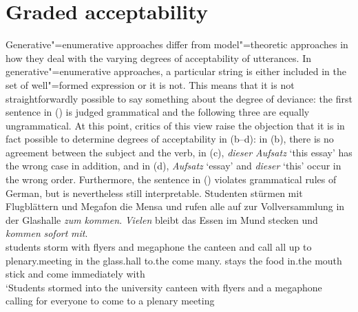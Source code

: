 \section{Graded acceptability}

Generative"=enumerative approaches differ from model"=theoretic approaches in how they deal with the varying degrees of acceptability
of utterances. In generative"=enumerative approaches, a particular string is either included in the set of well"=formed expression or it is not.
This means that it is not straightforwardly possible to say something about the degree of deviance: the first sentence in () is judged grammatical
and the following three are equally ungrammatical.
\eal
{}
\zl
At this point, critics of this view raise the objection that it is in fact possible to determine degrees of acceptability
in (b--d): in (b), there is no agreement between the subject and the verb, in
(c),  \emph{dieser Aufsatz} `this essay'  has the wrong case in addition, and in (d),
\emph{Aufsatz} `essay' and \emph{dieser} `this' occur in the wrong order. Furthermore,
 the sentence in () violates grammatical rules of German, but is nevertheless still interpretable.
\ea
\gll Studenten stürmen mit Flugblättern und Megafon die Mensa und rufen alle auf zur Vollversammlung in der Glashalle \emph{zum} \emph{kommen}. \emph{Vielen} bleibt das Essen im Mund stecken und \emph{kommen} \emph{sofort} \emph{mit}.\footnotemark\\
students storm with flyers and megaphone the canteen and call all up to plenary.meeting in the glass.hall to.the come many.\dat{} stays the food in.the mouth stick and come immediately with\\
\glt `Students stormed into the university canteen with flyers and a megaphone calling for everyone to come to a plenary meeting
